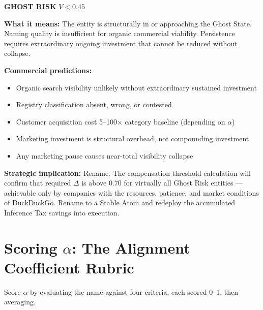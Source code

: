 \documentclass[12pt, openany]{book}
\theoremstyle{thmstyle}
\theoremstyle{defstyle}
\begin{document}
\begin{ghostbox2}
\textbf{GHOST RISK} \hfill $V < 0.45$

\vspace{4pt}
\textbf{What it means:} The entity is structurally in or approaching the Ghost State. Naming quality is insufficient for organic commercial viability. Persistence requires extraordinary ongoing investment that cannot be reduced without collapse.

\textbf{Commercial predictions:}
\begin{itemize}[leftmargin=1.5em, topsep=2pt]
  \item Organic search visibility unlikely without extraordinary sustained investment
  \item Registry classification absent, wrong, or contested
  \item Customer acquisition cost 5--100$\times$ category baseline (depending on $\alpha$)
  \item Marketing investment is structural overhead, not compounding investment
  \item Any marketing pause causes near-total visibility collapse
\end{itemize}

\textbf{Strategic implication:} Rename. The compensation threshold calculation will confirm that required $\Delta$ is above $0.70$ for virtually all Ghost Risk entities --- achievable only by companies with the resources, patience, and market conditions of DuckDuckGo. Rename to a Stable Atom and redeploy the accumulated Inference Tax savings into execution.
\end{ghostbox2}

\section{Scoring $\alpha$: The Alignment Coefficient Rubric}

Score $\alpha$ by evaluating the name against four criteria, each scored 0--1, then averaging.
\end{document}
